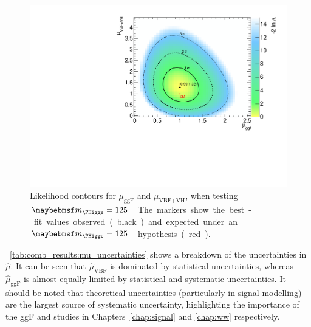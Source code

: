 \begin{figure}[t]
	\includegraphics[width=\mediumfigwidth]{custom_images/limits/muvbf_vs_muggf}
	\caption{Likelihood contours for $\mu_{\text{ggF}}$ and $\mu_{\text{VBF+VH}}$, when 
	testing \unit{$\mH = 125$}{\GeV}. The markers show the best-fit values observed 
	(black) and expected under an \unit{$\mH = 125$}{\GeV} hypothesis (red).}
	\label{fig:comb_results:muvbf_vs_muggf}
\end{figure}

\Table~\ref{tab:comb_results:mu_uncertainties} shows a breakdown of the uncertainties in 
$\hat{\mu}$. It can be seen that $\hat{\mu}_{\text{VBF}}$ is dominated by statistical 
uncertainties, whereas $\hat{\mu}_{\text{ggF}}$ is almost equally limited by statistical 
and systematic uncertainties. It should be noted that theoretical uncertainties 
(particularly in signal modelling) are the largest source of systematic uncertainty, 
highlighting the importance of the ggF and \WW studies in Chapters~\ref{chap:signal} and 
\ref{chap:ww} respectively.

